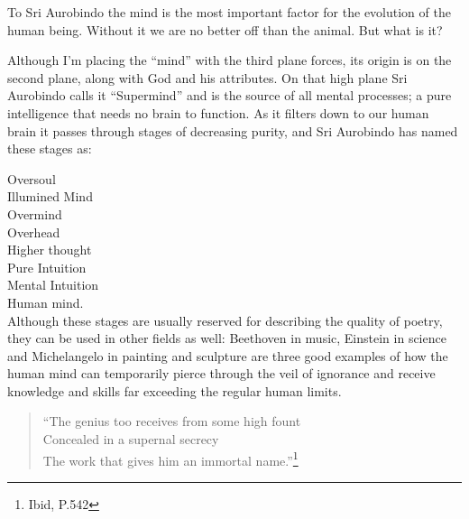 \documentclass[12pt,a4paper]{book}
\begin{document}
To Sri Aurobindo the mind is the most important factor for the
evolution of the human being. Without it we are no better off than the
animal. But what is it?

Although I'm placing the ``mind'' with the third plane forces, its
origin is on the second plane, along with God and his attributes. On
that high plane Sri Aurobindo calls it ``Supermind'' and is the source
of all mental processes; a pure intelligence that needs no brain to
function. As it filters down to our human brain it passes through
stages of decreasing purity, and Sri Aurobindo has named these stages
as:

\noindent Oversoul\\
Illumined Mind\\
Overmind\\
Overhead\\
Higher thought\\
Pure Intuition\\
Mental Intuition\\
Human mind.\\


Although these stages are usually reserved for describing the quality
of poetry, they can be used in other fields as well: Beethoven in
music, Einstein in science and Michelangelo in painting and sculpture
are three good examples of how the human mind can temporarily pierce
through the veil of ignorance and receive knowledge and skills far
exceeding the regular human limits.

\begin{verse}
``The genius too receives from some high fount\\
Concealed in a supernal secrecy\\
The work that gives him an immortal name.''\footnote{Ibid, P.542}
\end{verse}
\end{document}
